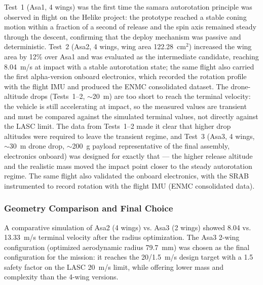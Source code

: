 Test~1 (Asa1, 4 wings) was the first time the samara autorotation
principle was observed in flight on the Helike project: the
prototype reached a stable coning motion within a fraction of a
second of release and the spin axis remained steady through the
descent, confirming that the deploy mechanism was passive and
deterministic. Test~2 (Asa2, 4 wings, wing area 122.28~cm$^2$)
increased the wing area by 12\% over Asa1 and was evaluated as the
intermediate candidate, reaching 8.04~m/s at impact with a stable
autorotation state; the same flight also carried the first
alpha-version onboard electronics, which recorded the rotation
profile with the flight IMU and produced the ENMC consolidated
dataset. The drone-altitude drops (Tests~1--2, $\sim$20~m) are too
short to reach the terminal velocity: the vehicle is still
accelerating at impact, so the measured values are transient and
must be compared against the simulated terminal values, not
directly against the LASC limit. The data from Tests~1--2 made it
clear that higher drop altitudes were required to leave the
transient regime, and Test~3 (Asa3, 4 wings, $\sim$30~m drone
drop, $\sim$200~g payload representative of the final assembly,
electronics onboard) was designed for exactly that --- the higher
release altitude and the realistic mass moved the impact point
closer to the steady autorotation regime. The same flight also
validated the onboard electronics, with the SRAB instrumented to
record rotation with the flight IMU (ENMC consolidated data).

\subsubsection{Geometry Comparison and Final Choice}

A comparative simulation of Asa2 (4 wings) vs. Asa3 (2 wings) showed
8.04 vs. 13.33~m/s terminal velocity after the radius optimization.
The Asa3 2-wing configuration (optimized aerodynamic radius
79.7~mm) was chosen as the final configuration for the mission: it
reaches the 20/1.5~m/s design target with a 1.5 safety factor on the
LASC 20~m/s limit, while offering lower mass and complexity than the
4-wing versions.

